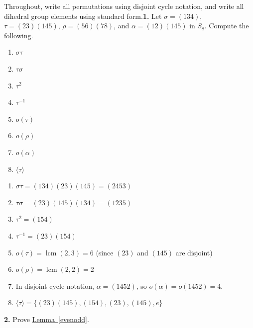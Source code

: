 \documentclass[10pt,]{book}
\theoremstyle{plain}
\theoremstyle{definition}
\theoremstyle{definition}
\theoremstyle{definition}
\theoremstyle{definition}
\numberwithin{equation}{section}
\DeclareMathOperator{\lcm}{lcm}
\begin{document}
Throughout, write all permutations using disjoint cycle notation, and write all dihedral group elements using standard form.\noindent\textbf{1.}\quad{}
        Let \(\sigma=(134)\), \(\tau=(23)(145)\), \(\rho=(56)(78)\), and \(\alpha=(12)(145)\) in \(S_8\). Compute the following.
        \leavevmode%
\begin{multicols}{4}
\begin{enumerate}[label=(\alph*)]
\item\hypertarget{li-360}{}
              \(\sigma \tau\)
\item\hypertarget{li-361}{}
              \(\tau \sigma\)
\item\hypertarget{li-362}{}
              \(\tau^2\)
\item\hypertarget{li-363}{}
              \(\tau^{-1}\)
\item\hypertarget{li-364}{}
              \(o(\tau)\)
\item\hypertarget{li-365}{}
              \(o(\rho)\)
\item\hypertarget{li-366}{}
              \(o(\alpha)\)
\item\hypertarget{li-367}{}
              \(\langle \tau\rangle\)
\end{enumerate}
\end{multicols}

\par\smallskip
\leavevmode%
\begin{enumerate}[label=(\alph*)]
\item\hypertarget{li-368}{}
          \(\sigma \tau= (134)(23)(145)=(2453)\)
\item\hypertarget{li-369}{}
          \(\tau \sigma=  (23)(145)(134)=(1235)\)
\item\hypertarget{li-370}{}
          \(\tau^2=(154)\)
\item\hypertarget{li-371}{}
          \(\tau^{-1}=(23)(154)\)
\item\hypertarget{li-372}{}
          \(o(\tau)=\lcm(2,3)=6\) (since \((23)\) and \((145)\) are disjoint)
\item\hypertarget{li-373}{}
          \(o(\rho)=\lcm(2,2)=2\)
\item\hypertarget{li-374}{}
          In disjoint cycle notation, \(\alpha=(1452)\), so \(o(\alpha)=o(1452)=4\).
\item\hypertarget{li-375}{}
          \(\langle \tau\rangle =\{(23)(145), (154), (23), (145), e\}\)
\end{enumerate}
\par\smallskip
\noindent\textbf{2.}\quad{}
        Prove \hyperref[evenodd]{Lemma~\ref{evenodd}}.
\par\smallskip
\end{document}
